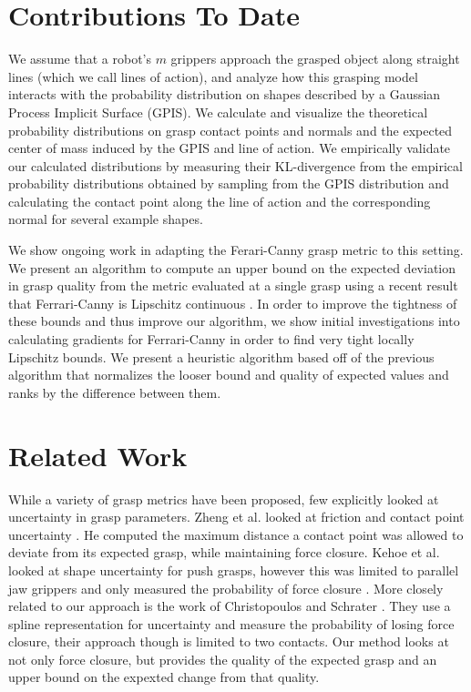 \documentclass[letterpaper, 10 pt, conference]{ieeeconf}  %
\begin{document}
\section{Contributions To Date}
We assume that a robot's $m$ grippers approach the grasped object along straight lines (which we call lines of action), and analyze how this grasping model interacts with the probability distribution on shapes described by a Gaussian Process Implicit Surface (GPIS).
We calculate and visualize the theoretical probability distributions on grasp contact points and normals and the expected center of mass induced by the GPIS and line of action.
We empirically validate our calculated distributions by measuring their KL-divergence from the empirical probability distributions obtained by sampling from the GPIS distribution and calculating the contact point along the line of action and the corresponding normal for several example shapes.

We show ongoing work in adapting the Ferari-Canny grasp metric to this setting.
We present an algorithm to compute an upper bound on the expected deviation in grasp quality from the metric evaluated at a single grasp using a recent result that Ferrari-Canny is Lipschitz continuous \cite{pokorny2013classical}.
In order to improve the tightness of these bounds and thus improve our algorithm, we show initial investigations into calculating gradients for Ferrari-Canny in order to find very tight locally Lipschitz bounds.
We present a heuristic algorithm based off of the previous algorithm that normalizes the looser bound and quality of expected values and ranks by the difference between them. 

\section{Related Work}

While a variety of grasp metrics have been proposed, few explicitly looked at uncertainty in grasp parameters. Zheng et al. looked at friction and contact point uncertainty \cite{zheng2005}. He computed the maximum distance a contact point was allowed to deviate from its expected grasp, while maintaining force closure. Kehoe et al. looked at shape uncertainty for push grasps, however this was limited to parallel jaw grippers and only measured the probability of force closure \cite{kehoe2012toward}. More closely related to our approach is the work of Christopoulos and Schrater \cite{christopoulos2007handling}. They use a spline representation for uncertainty and measure the probability of losing force closure, their approach though is limited to two contacts. Our method looks at not only force closure, but provides the quality of the expected grasp and an upper bound on the expexted change from that quality. 
\end{document}
